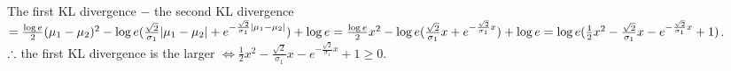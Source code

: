 \begin{pr}
\begin{enumerate}[(a)]
The first KL divergence $-$ the second KL divergence $=\frac{\log e}2(\mu_1-\mu_2)^2-\log e(\frac{\sqrt2}{\sigma_1}|\mu_1-\mu_2|+e^{-\frac{\sqrt2}{\sigma_1}|\mu_1-\mu_2|})+\log e\\
=\frac{\log e}2x^2-\log e(\frac{\sqrt2}{\sigma_1}x+e^{-\frac{\sqrt2}{\sigma_1}x})+\log e\\
=\log e(\frac12x^2-\frac{\sqrt2}{\sigma_1}x-e^{-\frac{\sqrt2}{\sigma_1}x}+1)$.\\
$\therefore$ the first KL divergence is the larger $\iff\frac12x^2-\frac{\sqrt2}{\sigma_1}x-e^{-\frac{\sqrt2}{\sigma_1}x}+1\geq0$.
\end{enumerate}
\end{pr}

